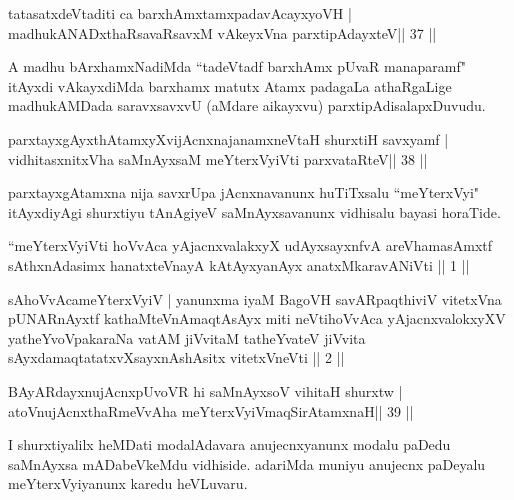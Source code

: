 \begin{shl}
tatasatxdeVtaditi ca barxhAmxtamxpadavAcayxyoVH |
madhukANADxthaRsavaRsavxM vAkeyxVna parxtipAdayxteV\hfill || 37 ||
\end{shl}

\begin{artha}
A madhu bArxhamxNadiMda ``tadeVtadf barxhAmx pUvaR manaparamf" itAyxdi vAkayxdiMda barxhamx matutx Atamx padagaLa athaRgaLige madhukAMDada saravxsavxvU (aMdare aikayxvu) parxtipAdisalapxDuvudu.
\end{artha}


\begin{shl}
parxtayxgAyxthAtamxyXvijAcnxnajanamxneV\s taH shurxtiH savxyamf |
vidhitasxnitxVha saMnAyxsaM meYterxVyiVti parxvataRteV\hfill || 38 ||
\end{shl}

\begin{artha}
parxtayxgAtamxna nija savxrUpa jAcnxnavanunx huTiTxsalu ``meYterxVyi" itAyxdiyAgi shurxtiyu tAnAgiyeV saMnAyxsavanunx vidhisalu bayasi horaTide.
\end{artha}


\begin{shl}
``meYterxVyiVti hoVvAca yAjacnxvalakxyX udAyxsayxnfvA 
areV\s hamasAmxtf sAthxnAdasimx hanatxteV\s nayA
kAtAyxyanAyx anatxMkaravANiVti || 1 ||

sAhoVvAcameYterxVyiV | yanunxma iyaM BagoVH
savARpaqthiviV vitetxVna pUNARnAyxtf kathaMteVnA\s maqtAsAyx
miti neVtihoVvAca yAjacnxvalokxyXV yatheYvoVpakaraNa
vatAM jiVvitaM tatheYvateV jiVvita sAyxdamaqtatatxvXsayxnAshAsitx
vitetxVneVti || 2 ||
\end{shl}


\begin{shl}
BAyARdayxnujAcnxpUvoVR hi saMnAyxsoV vihitaH shurxtw |
atoV\s nujAcnxthaRmeVvA\s\s ha meYterxVyiVmaqSirAtamxnaH\hfill || 39 ||
\end{shl}

\begin{artha}
I shurxtiyalilx heMDati modalAdavara anujecnxyanunx modalu paDedu saMnAyxsa mADabeVkeMdu vidhiside. adariMda muniyu anujecnx paDeyalu meYterxVyiyanunx karedu heVLuvaru.
\end{artha}

